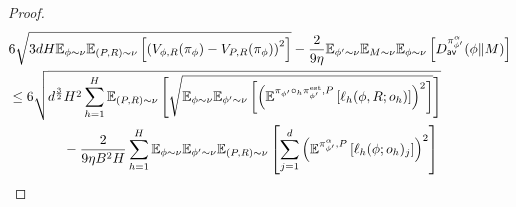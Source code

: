 \begin{proof}

\begin{align*}
    &6\sqrt{3dH\E_{\phi \sim \nu}\E_{(P,R) \sim \nu}\left[\left(V_{\phi, R}(\pi_{\phi}) - V_{P,R}(\pi_{\phi}) \right)^2\right]}   - \frac{2}{9\eta}\E_{\phi'\sim \nu}\E_{M \sim \nu}\E_{\phi \sim \nu}\left[D_{\hbi}^{\pi_{\phi'}^\alpha}(\phi\|M)\right] 
    \\&\le 6\sqrt{d^{\frac{3}{2}}H^2\sum_{h=1}^H\E_{(P,R) \sim \nu}\left[\sqrt{\E_{\phi \sim \nu}\E_{\phi' \sim \nu}\left[\left(  \E^{\pi_{\phi'} \circ_h \pi_{\phi'}^{\esttt}, P}\left[\ellest_h(\phi, R; o_h)\right]\right)^2\right]}\right]} 
    \\&\qquad \qquad - \frac{2}{9\eta B^2H}\sum_{h=1}^H \E_{\phi \sim \nu}\E_{\phi' \sim \nu}\E_{(P,R) \sim \nu} \left[\sum_{j=1}^d\left( \E^{\pi_{\phi'}^\alpha, P}\left[ \ellest_h(\phi; o_h)_j\right]\right)^2\right]

\end{align*}
\end{proof}
